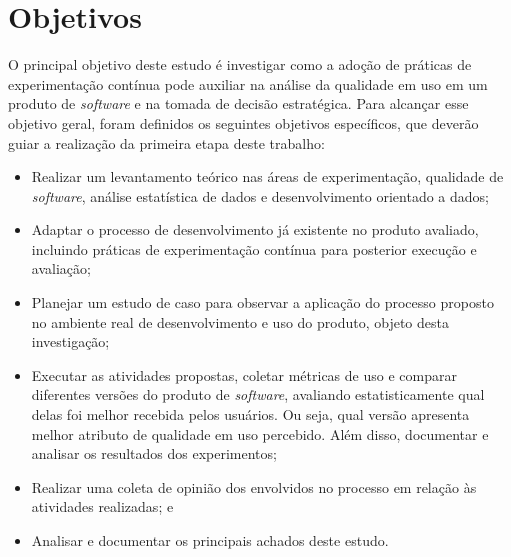 
\section{Objetivos}
\label{subsec:objetivos-pesquisa}

O principal objetivo deste estudo é investigar como a adoção de práticas de experimentação contínua pode auxiliar na análise da qualidade em uso em um produto de \textit{software} e na tomada de decisão estratégica. Para alcançar esse objetivo geral, foram definidos os seguintes objetivos específicos, que deverão guiar a realização da primeira etapa deste trabalho:

\begin{itemize} 
    \item Realizar um levantamento teórico nas áreas de experimentação, qualidade de \textit{software}, análise estatística  de dados e desenvolvimento orientado a dados; 
    \item Adaptar o processo de desenvolvimento já existente no produto avaliado, incluindo práticas de experimentação contínua para posterior execução e avaliação; 
    \item Planejar um estudo de caso para observar a aplicação do processo proposto no ambiente real de desenvolvimento e uso do produto, objeto desta investigação;
    \item Executar as atividades propostas, coletar métricas de uso e comparar diferentes versões do produto de \textit{software}, avaliando estatisticamente qual delas foi melhor recebida pelos usuários. Ou seja, qual versão apresenta melhor atributo de qualidade em uso percebido. Além disso, documentar e analisar os resultados dos experimentos;
    \item Realizar uma coleta de opinião dos envolvidos no processo em relação às atividades realizadas; e 
    \item Analisar e documentar os principais achados deste estudo. 
\end{itemize}